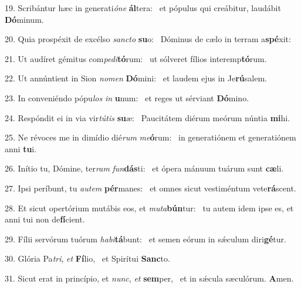 19. Scribántur hæc in generati\textit{ó}\textit{ne} \textbf{ál}tera: \ast\  et pópulus qui creábitur, laudábit \textbf{Dó}minum.\

20. Quia prospéxit de excélso \textit{sanc}\textit{to} \textbf{su}o: \ast\  Dóminus de cælo in terram a\textbf{spé}xit:\

21. Ut audíret gémitus com\textit{pe}\textit{di}\textbf{tó}rum: \ast\  ut sólveret fílios interemp\textbf{tó}rum.\

22. Ut annúntient in Sion \textit{no}\textit{men} \textbf{Dó}mini: \ast\  et laudem ejus in Je\textbf{rú}salem.\

23. In conveniéndo pópu\textit{los} \textit{in} \textbf{u}num: \ast\  et reges ut sérviant \textbf{Dó}mino.\

24. Respóndit ei in via vir\textit{tú}\textit{tis} \textbf{su}æ: \ast\  Paucitátem diérum meórum núntia \textbf{mi}hi.\

25. Ne révoces me in dimídio dié\textit{rum} \textit{me}\textbf{ó}rum: \ast\  in generatiónem et generatiónem anni \textbf{tu}i.\

26. Inítio tu, Dómine, ter\textit{ram} \textit{fun}\textbf{dás}ti: \ast\  et ópera mánuum tuárum sunt \textbf{cæ}li.\

27. Ipsi períbunt, tu \textit{au}\textit{tem} \textbf{pér}manes: \ast\  et omnes sicut vestiméntum vete\textbf{rá}scent.\

28. Et sicut opertórium mutábis eos, et \textit{mu}\textit{ta}\textbf{bún}tur: \ast\  tu autem idem ipse es, et anni tui non de\textbf{fí}cient.\

29. Fílii servórum tuórum \textit{ha}\textit{bi}\textbf{tá}bunt: \ast\  et semen eórum in sǽculum diri\textbf{gé}tur.\

30. Glória Pa\textit{tri}, \textit{et} \textbf{Fí}lio, \ast\  et Spirítui \textbf{Sanc}to.\

31. Sicut erat in princípio, et \textit{nunc}, \textit{et} \textbf{sem}per, \ast\  et in sǽcula sæculórum. \textbf{A}men.\


